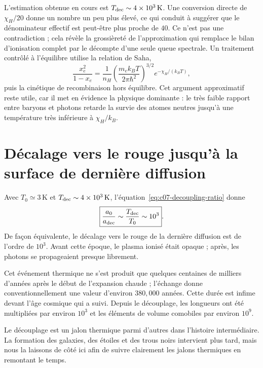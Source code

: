 L’estimation obtenue en cours est \(T_{\rm dec}\sim4\times10^3\,\mathrm{K}\). Une conversion directe de \(\chi_H/20\) donne un nombre un peu plus élevé, ce qui conduit à suggérer que le dénominateur effectif est peut-être plus proche de \(40\). Ce n’est pas une contradiction ; cela révèle la grossièreté de l’approximation qui remplace le bilan d’ionisation complet par le décompte d’une seule queue spectrale. Un traitement contrôlé à l’équilibre utilise la relation de Saha,
\begin{equation}
\frac{x_e^2}{1-x_e}
=
\frac{1}{n_H}
\left(\frac{m_e k_BT}{2\pi\hbar^2}\right)^{3/2}
e^{-\chi_H/(k_BT)},
\label{eq:c07-saha}
\end{equation}
puis la cinétique de recombinaison hors équilibre. Cet argument approximatif reste utile, car il met en évidence la physique dominante : le très faible rapport entre baryons et photons retarde la survie des atomes neutres jusqu’à une température très inférieure à \(\chi_H/k_B\).

\section{Décalage vers le rouge jusqu’à la surface de dernière diffusion}

Avec \(T_0\simeq3\,\mathrm{K}\) et \(T_{\rm dec}\sim4\times10^3\,\mathrm{K}\), l’équation~\eqref{eq:c07-decoupling-ratio} donne
\begin{equation}
\boxed{
\frac{a_0}{a_{\rm dec}}
\sim
\frac{T_{\rm dec}}{T_0}
\sim10^3
}.
\label{eq:c07-decoupling-expansion}
\end{equation}
De façon équivalente, le décalage vers le rouge de la dernière diffusion est de l’ordre de \(10^3\). Avant cette époque, le plasma ionisé était opaque ; après, les photons se propageaient presque librement.

Cet événement thermique ne s’est produit que quelques centaines de milliers d’années après le début de l’expansion chaude ; l’échange donne conventionnellement une valeur d’environ \(380{,}000\) années. Cette durée est infime devant l’âge cosmique qui a suivi. Depuis le découplage, les longueurs ont été multipliées par environ \(10^3\) et les éléments de volume comobiles par environ \(10^9\).

Le découplage est un jalon thermique parmi d’autres dans l’histoire intermédiaire. La formation des galaxies, des étoiles et des trous noirs intervient plus tard, mais nous la laissons de côté ici afin de suivre clairement les jalons thermiques en remontant le temps.

